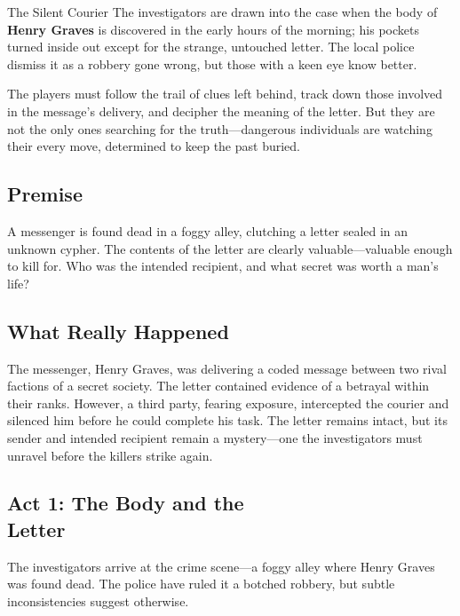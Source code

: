 \begin{WyrdScenarioHeading}{The Silent Courier}
    The investigators are drawn into the case when the body of \textbf{Henry Graves} is discovered in the early hours of the morning; his pockets turned inside out except for the strange, untouched letter. The local police dismiss it as a robbery gone wrong, but those with a keen eye know better.

    The players must follow the trail of clues left behind, track down those involved in the message's delivery, and decipher the meaning of the letter. But they are not the only ones searching for the truth—dangerous individuals are watching their every move, determined to keep the past buried.

    \subsection*{Premise} 
    A messenger is found dead in a foggy alley, clutching a letter sealed in an unknown cypher. The contents of the letter are clearly valuable—valuable enough to kill for. Who was the intended recipient, and what secret was worth a man's life?

    \subsection*{What Really Happened} 
    The messenger, Henry Graves, was delivering a coded message between two rival factions of a secret society. The letter contained evidence of a betrayal within their ranks. However, a third party, fearing exposure, intercepted the courier and silenced him before he could complete his task. The letter remains intact, but its sender and intended recipient remain a mystery—one the investigators must unravel before the killers strike again.
\end{WyrdScenarioHeading}



\subsection{Act 1: The Body and the\\Letter}  
The investigators arrive at the crime scene—a foggy alley where Henry Graves was found dead. The police have ruled it a botched robbery, but subtle inconsistencies suggest otherwise.  


